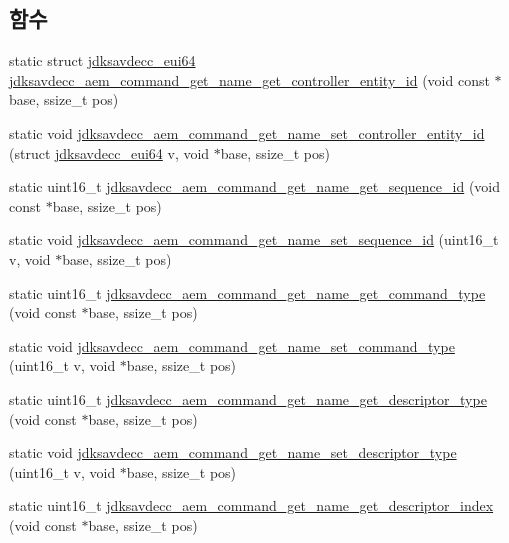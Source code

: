 \subsection*{함수}
\begin{DoxyCompactItemize}
\item 
static struct \hyperlink{structjdksavdecc__eui64}{jdksavdecc\+\_\+eui64} \hyperlink{group__command__get__name_ga92f46d11aa563f42003e290a8807655b}{jdksavdecc\+\_\+aem\+\_\+command\+\_\+get\+\_\+name\+\_\+get\+\_\+controller\+\_\+entity\+\_\+id} (void const $\ast$base, ssize\+\_\+t pos)
\item 
static void \hyperlink{group__command__get__name_gafa778e0039843b0e0c4dd56029d14866}{jdksavdecc\+\_\+aem\+\_\+command\+\_\+get\+\_\+name\+\_\+set\+\_\+controller\+\_\+entity\+\_\+id} (struct \hyperlink{structjdksavdecc__eui64}{jdksavdecc\+\_\+eui64} v, void $\ast$base, ssize\+\_\+t pos)
\item 
static uint16\+\_\+t \hyperlink{group__command__get__name_ga1d94f512e9963799dce4efca30d44493}{jdksavdecc\+\_\+aem\+\_\+command\+\_\+get\+\_\+name\+\_\+get\+\_\+sequence\+\_\+id} (void const $\ast$base, ssize\+\_\+t pos)
\item 
static void \hyperlink{group__command__get__name_ga2886262e5deda583ee8e0b717305ae0d}{jdksavdecc\+\_\+aem\+\_\+command\+\_\+get\+\_\+name\+\_\+set\+\_\+sequence\+\_\+id} (uint16\+\_\+t v, void $\ast$base, ssize\+\_\+t pos)
\item 
static uint16\+\_\+t \hyperlink{group__command__get__name_ga9ee8ca4dc648066b8f6581467a72c65f}{jdksavdecc\+\_\+aem\+\_\+command\+\_\+get\+\_\+name\+\_\+get\+\_\+command\+\_\+type} (void const $\ast$base, ssize\+\_\+t pos)
\item 
static void \hyperlink{group__command__get__name_ga71948c35c8fc77b159b5add0e3695196}{jdksavdecc\+\_\+aem\+\_\+command\+\_\+get\+\_\+name\+\_\+set\+\_\+command\+\_\+type} (uint16\+\_\+t v, void $\ast$base, ssize\+\_\+t pos)
\item 
static uint16\+\_\+t \hyperlink{group__command__get__name_ga70f53d4ed25080ab3cc3934fb9946f86}{jdksavdecc\+\_\+aem\+\_\+command\+\_\+get\+\_\+name\+\_\+get\+\_\+descriptor\+\_\+type} (void const $\ast$base, ssize\+\_\+t pos)
\item 
static void \hyperlink{group__command__get__name_gadab984a13902ca7a500337c5dff72316}{jdksavdecc\+\_\+aem\+\_\+command\+\_\+get\+\_\+name\+\_\+set\+\_\+descriptor\+\_\+type} (uint16\+\_\+t v, void $\ast$base, ssize\+\_\+t pos)
\item 
static uint16\+\_\+t \hyperlink{group__command__get__name_gafd3e0e1713eef4a60e5f1a6d25571bd6}{jdksavdecc\+\_\+aem\+\_\+command\+\_\+get\+\_\+name\+\_\+get\+\_\+descriptor\+\_\+index} (void const $\ast$base, ssize\+\_\+t pos)

\end{DoxyCompactItemize}
